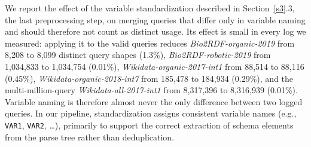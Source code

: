 \documentclass[sw]{iosart2x}
\begin{document}
We report the effect of the variable standardization described in Section~\ref{s3}.3, the last preprocessing step, on merging queries that differ only in variable naming and should therefore not count as distinct usage. Its effect is small in every log we measured: applying it to the valid queries reduces \emph{Bio2RDF-organic-2019} from 8{,}208 to 8{,}099 distinct query shapes (1.3\%), \emph{Bio2RDF-robotic-2019} from 1{,}034{,}833 to 1{,}034{,}754 (0.01\%), \emph{Wikidata-organic-2017-int1} from 88{,}514 to 88{,}116 (0.45\%), \emph{Wikidata-organic-2018-int7} from 185{,}478 to 184{,}934 (0.29\%), and the multi-million-query \emph{Wikidata-all-2017-int1} from 8{,}317{,}396 to 8{,}316{,}939 (0.01\%). Variable naming is therefore almost never the only difference between two logged queries.  In our pipeline, standardization assigns consistent variable names (e.g., \texttt{VAR1}, \texttt{VAR2}, \ldots), primarily to support the correct extraction of schema elements from the parse tree rather than deduplication.






\end{document}
